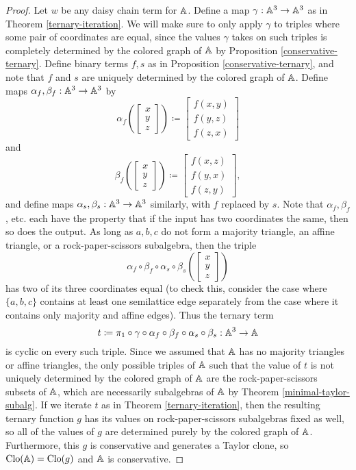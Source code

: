 \documentclass[letterpaper,11pt]{article}
\DeclareMathOperator{\Clo}{Clo}
\begin{document}
\begin{proof} Let $w$ be any daisy chain term for $\mathbb{A}$. Define a map $\gamma : \mathbb{A}^3 \rightarrow \mathbb{A}^3$ as in Theorem \ref{ternary-iteration}. We will make sure to only apply $\gamma$ to triples where some pair of coordinates are equal, since the values $\gamma$ takes on such triples is completely determined by the colored graph of $\mathbb{A}$ by Proposition \ref{conservative-ternary}. Define binary terms $f,s$ as in Proposition \ref{conservative-ternary}, and note that $f$ and $s$ are uniquely determined by the colored graph of $\mathbb{A}$. Define maps $\alpha_f, \beta_f: \mathbb{A}^3 \rightarrow \mathbb{A}^3$ by
\[
\alpha_f\left(\begin{bmatrix}x\\ y\\ z\end{bmatrix}\right) \coloneqq \begin{bmatrix}f(x,y)\\ f(y,z)\\ f(z,x)\end{bmatrix}
\]
and
\[
\beta_f\left(\begin{bmatrix}x\\ y\\ z\end{bmatrix}\right) \coloneqq \begin{bmatrix}f(x,z)\\ f(y,x)\\ f(z,y)\end{bmatrix},
\]
and define maps $\alpha_s, \beta_s: \mathbb{A}^3 \rightarrow \mathbb{A}^3$ similarly, with $f$ replaced by $s$. Note that $\alpha_f, \beta_f$, etc. each have the property that if the input has two coordinates the same, then so does the output. As long as $a,b,c$ do not form a majority triangle, an affine triangle, or a rock-paper-scissors subalgebra, then the triple
\[
\alpha_f\circ\beta_f\circ\alpha_s\circ\beta_s\left(\begin{bmatrix}x\\ y\\ z\end{bmatrix}\right)
\]
has two of its three coordinates equal (to check this, consider the case where $\{a,b,c\}$ contains at least one semilattice edge separately from the case where it contains only majority and affine edges). Thus the ternary term
\[
t \coloneqq \pi_1\circ\gamma\circ\alpha_f\circ\beta_f\circ\alpha_s\circ\beta_s : \mathbb{A}^3 \rightarrow \mathbb{A}
\]
is cyclic on every such triple. Since we assumed that $\mathbb{A}$ has no majority triangles or affine triangles, the only possible triples of $\mathbb{A}$ such that the value of $t$ is not uniquely determined by the colored graph of $\mathbb{A}$ are the rock-paper-scissors subsets of $\mathbb{A}$, which are necessarily subalgebras of $\mathbb{A}$ by Theorem \ref{minimal-taylor-subalg}. If we iterate $t$ as in Theorem \ref{ternary-iteration}, then the resulting ternary function $g$ has its values on rock-paper-scissors subalgebras fixed as well, so all of the values of $g$ are determined purely by the colored graph of $\mathbb{A}$. Furthermore, this $g$ is conservative and generates a Taylor clone, so $\Clo(\bA) = \Clo(g)$ and $\mathbb{A}$ is conservative.
\end{proof}
\end{document}
